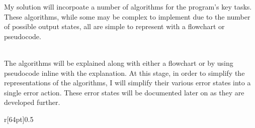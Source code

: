 \documentclass[../../main.tex]{subfiles}
\begin{document}
\noindent My solution will incorpoate a number of algorithms for the program's key tasks.
These algorithms, while some may be complex to implement due to the number of possible
output states, all are simple to represent with a flowchart or pseudocode.

\noindent \\ The algorithms will be explained along with either a flowchart or by
using pseudocode inline with the explanation. At this stage, in order to simplify
the representations of the algorithms,  I will simplify their various error states
into a single error action. These error states will be documented later on as they
are developed further.

\begin{dummyenv}
    \begin{wrapfigure}{r}[64pt]{0.5\textwidth}
        \begin{framed}{}
\end{framed}
\end{wrapfigure}
\end{dummyenv}
\end{document}
